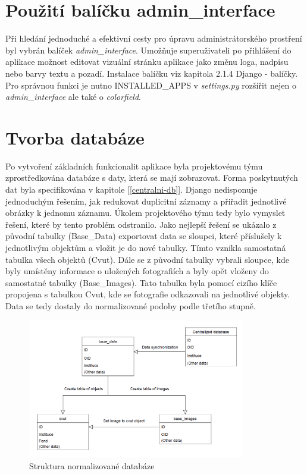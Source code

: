 \newpage

\section{Použití balíčku admin\_interface}

Při hledání jednoduché a efektivní cesty pro úpravu administrátorského prostření byl vybrán balíček \emph{admin\_interface}. Umožňuje superuživateli po přihlášení do aplikace možnost editovat vizuální stránku aplikace jako změnu loga, nadpisu nebo barvy textu a pozadí. Instalace balíčku viz kapitola 2.1.4 Django - balíčky. Pro správnou funkci je nutno INSTALLED\_APPS v \emph{settings.py} rozšířit nejen o \emph{admin\_interface} ale také o \emph{colorfield}.



\section{Tvorba databáze}
\label{tvorba-database}
Po vytvoření základních funkcionalit aplikace byla projektovému týmu zprostředkována databáze s daty, která se mají zobrazovat. Forma poskytnutých dat byla specifikována v kapitole [\ref{centralni-db}]. Django nedisponuje jednoduchým řešením, jak redukovat duplicitní záznamy a přiřadit jednotlivé obrázky k jednomu záznamu. Úkolem projektového týmu tedy bylo vymyslet řešení, které by tento problém odstranilo. Jako nejlepší řešení se ukázalo z původní tabulky (Base\_Data) exportovat data se sloupci, které příslušely k jednotlivým objektům a vložit je do nové tabulky. Tímto vznikla samostatná tabulka všech objektů (Cvut). Dále se z původní tabulky vybrali sloupce, kde byly umístěny informace o uložených fotografiích a byly opět vloženy do samostatné tabulky (Base\_Images). Tato tabulka byla pomocí cizího klíče propojena s tabulkou Cvut, kde se fotografie odkazovali na jednotlivé objekty. Data se tedy dostaly do normalizované podoby podle třetího stupně.

\begin{figure}[H] \centering
    \includegraphics[width=270pt]{./pictures/18-db-diagram-1.PNG}
    \caption[Struktura normalizované databáze]{Struktura normalizované databáze}
	\label{fig:Struktura noramlizované databáze}              
\end{figure}

